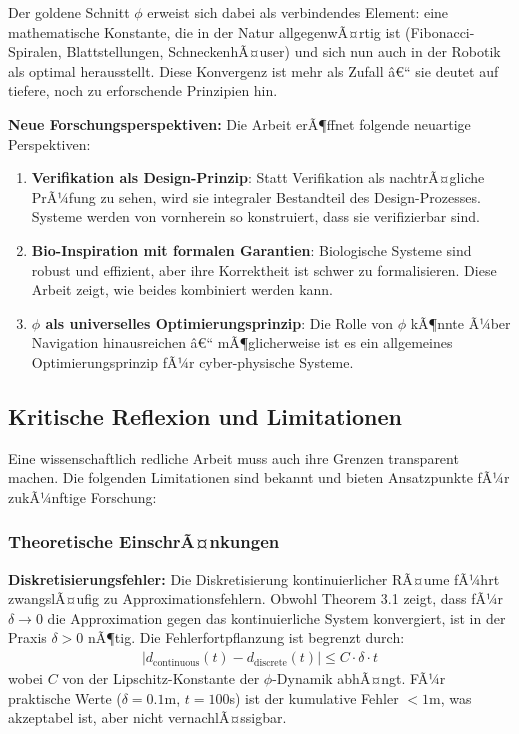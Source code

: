 ﻿\documentclass[a4paper,12pt]{article}
\theoremstyle{definition}
\begin{document}
Der goldene Schnitt $\phi$ erweist sich dabei als verbindendes Element: eine mathematische Konstante, die in der Natur allgegenwÃ¤rtig ist (Fibonacci-Spiralen, Blattstellungen, SchneckenhÃ¤user) und sich nun auch in der Robotik als optimal herausstellt. Diese Konvergenz ist mehr als Zufall â€“ sie deutet auf tiefere, noch zu erforschende Prinzipien hin.

\textbf{Neue Forschungsperspektiven:}
Die Arbeit erÃ¶ffnet folgende neuartige Perspektiven:

\begin{enumerate}
	\item \textbf{Verifikation als Design-Prinzip}: Statt Verifikation als nachtrÃ¤gliche PrÃ¼fung zu sehen, wird sie integraler Bestandteil des Design-Prozesses. Systeme werden von vornherein so konstruiert, dass sie verifizierbar sind.
	
	\item \textbf{Bio-Inspiration mit formalen Garantien}: Biologische Systeme sind robust und effizient, aber ihre Korrektheit ist schwer zu formalisieren. Diese Arbeit zeigt, wie beides kombiniert werden kann.
	
	\item \textbf{$\phi$ als universelles Optimierungsprinzip}: Die Rolle von $\phi$ kÃ¶nnte Ã¼ber Navigation hinausreichen â€“ mÃ¶glicherweise ist es ein allgemeines Optimierungsprinzip fÃ¼r cyber-physische Systeme.
\end{enumerate}

\subsection{Kritische Reflexion und Limitationen}

Eine wissenschaftlich redliche Arbeit muss auch ihre Grenzen transparent machen. Die folgenden Limitationen sind bekannt und bieten Ansatzpunkte fÃ¼r zukÃ¼nftige Forschung:

\subsubsection{Theoretische EinschrÃ¤nkungen}

\textbf{Diskretisierungsfehler:}
Die Diskretisierung kontinuierlicher RÃ¤ume fÃ¼hrt zwangslÃ¤ufig zu Approximationsfehlern. Obwohl Theorem 3.1 zeigt, dass fÃ¼r $\delta \to 0$ die Approximation gegen das kontinuierliche System konvergiert, ist in der Praxis $\delta > 0$ nÃ¶tig. Die Fehlerfortpflanzung ist begrenzt durch:
\begin{align}
	|d_{\text{continuous}}(t) - d_{\text{discrete}}(t)| \leq C \cdot \delta \cdot t
\end{align}
wobei $C$ von der Lipschitz-Konstante der $\phi$-Dynamik abhÃ¤ngt. FÃ¼r praktische Werte ($\delta = 0.1$m, $t = 100$s) ist der kumulative Fehler $< 1$m, was akzeptabel ist, aber nicht vernachlÃ¤ssigbar.
\end{document}

